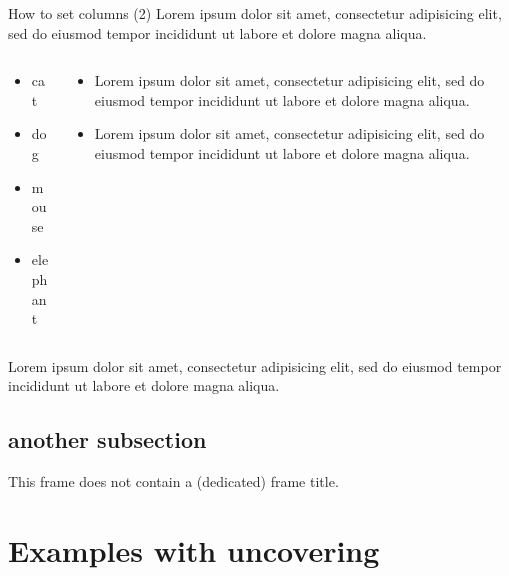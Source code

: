 \documentclass[10pt, aspectratio=1610]{beamer}
\begin{document}
\begin{frame}{How to set columns (2)}
	Lorem ipsum dolor sit amet, consectetur adipisicing elit, sed do eiusmod tempor incididunt ut labore et dolore magna aliqua. 
	\begin{columns}[t]
		\begin{column}{.35\textwidth}
			\begin{itemize}
				\item cat
				\item dog
				\item mouse
				\item elephant
			\end{itemize}
		\end{column}
		\begin{column}{.55\textwidth}
			\begin{itemize}
				\item Lorem ipsum dolor sit amet, consectetur adipisicing elit, sed do eiusmod tempor incididunt ut labore et dolore magna aliqua. 
				\item Lorem ipsum dolor sit amet, consectetur adipisicing elit, sed do eiusmod tempor incididunt ut labore et dolore magna aliqua. 
			\end{itemize}
		\end{column}
	\end{columns}

	Lorem ipsum dolor sit amet, consectetur adipisicing elit, sed do eiusmod tempor incididunt ut labore et dolore magna aliqua. 
\end{frame}

\subsection{another subsection}

\begin{frame}
	This frame does not contain a (dedicated) frame title.
\end{frame}

\section{Examples with uncovering}
\end{document}
